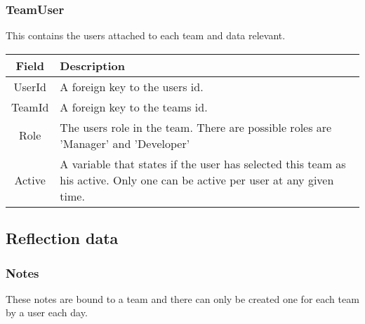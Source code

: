 \subsubsection*{TeamUser}
This contains the users attached to each team and data relevant. \\

\vspace{0.5cm}
\begin{tabularx}{\linewidth}{| c | X |}
    \hline
    \rowcolor[gray]{0.8}
    \textbf{Field} & \textbf{Description} \\
    \hline
    UserId & A foreign key to the users id.\\ \hline
   	TeamId & A foreign key to the teams id.\\ \hline
   	Role & The users role in the team. There are possible roles are 'Manager' and 'Developer'\\ \hline
    Active & A variable that states if the user has selected this team as his active. Only one can be active per user at any given time.\\ 
    \hline
\end{tabularx}
\vspace{0.5cm}

\subsection{Reflection data}
\subsubsection*{Notes}
These notes are bound to a team and there can only be created one for each team by a user each day. \\


